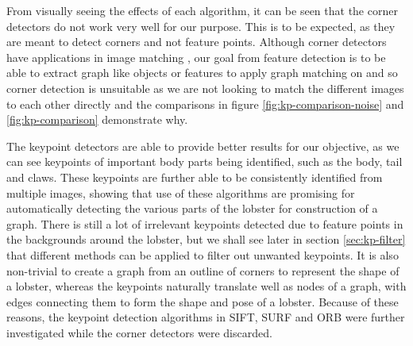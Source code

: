 \noindent
From visually seeing the effects of each algorithm, it can be seen that the corner detectors do not work very well for our purpose. This is to be expected, as they are meant to detect corners and not feature points. Although corner detectors have applications in image matching \cite{corner-detection}, our goal from feature detection is to be able to extract graph like objects or features to apply graph matching on and so corner detection is unsuitable as we are not looking to match the different images to each other directly and the comparisons in figure \ref{fig:kp-comparison-noise} and \ref{fig:kp-comparison} demonstrate why.

The keypoint detectors are able to provide better results for our objective, as we can see keypoints of important body parts being identified, such as the body, tail and claws. These keypoints are further able to be consistently identified from multiple images, showing that use of these algorithms are promising for automatically detecting the various parts of the lobster for construction of a graph. There is still a lot of irrelevant keypoints detected due to feature points in the backgrounds around the lobster, but we shall see later in section \ref{sec:kp-filter} that different methods can be applied to filter out unwanted keypoints. It is also non-trivial to create a graph from an outline of corners to represent the shape of a lobster, whereas the keypoints naturally translate well as nodes of a graph, with edges connecting them to form the shape and pose of a lobster. Because of these reasons, the keypoint detection algorithms in SIFT, SURF and ORB were further investigated while the corner detectors were discarded.

